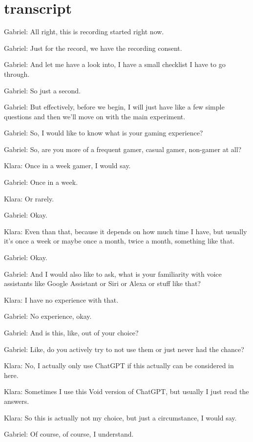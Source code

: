 
\section{transcript}

Gabriel: All right, this is recording started right now.

Gabriel: Just for the record, we have the recording consent.

Gabriel: And let me have a look into, I have a small checklist I have to go through.

Gabriel: So just a second.

Gabriel: But effectively, before we begin, I will just have like a few simple questions and then we'll move on with the main experiment.

Gabriel: So, I would like to know what is your gaming experience?

Gabriel: So, are you more of a frequent gamer, casual gamer, non-gamer at all?

Klara: Once in a week gamer, I would say.

Gabriel: Once in a week.

Klara: Or rarely.

Gabriel: Okay.

Klara: Even than that, because it depends on how much time I have, but usually it's once a week or maybe once a month, twice a month, something like that.

Gabriel: Okay.

Gabriel: And I would also like to ask, what is your familiarity with voice assistants like Google Assistant or Siri or Alexa or stuff like that?

Klara: I have no experience with that.

Gabriel: No experience, okay.

Gabriel: And is this, like, out of your choice?

Gabriel: Like, do you actively try to not use them or just never had the chance?

Klara: No, I actually only use ChatGPT if this actually can be considered in here.

Klara: Sometimes I use this Void version of ChatGPT, but usually I just read the answers.

Klara: So this is actually not my choice, but just a circumstance, I would say.

Gabriel: Of course, of course, I understand.

